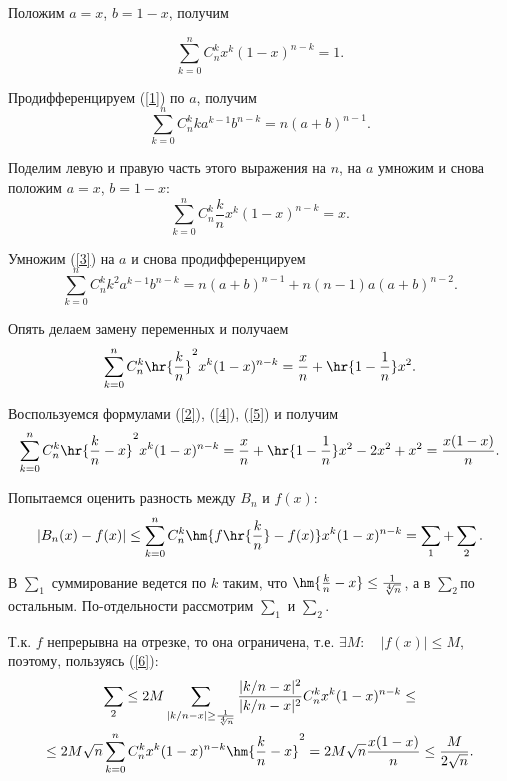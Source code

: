 \documentclass[a4paper]{article}
\begin{document}
Положим $a=x$, $b=1-x$, получим

\begin{equation}\label{2}
\sum_{k=0}^n C_n^k x^k (1-x)^{n-k}=1.
\end{equation}

Продифференцируем (\ref{1}) по $a$, получим
\begin{equation}\label{3}
\sum_{k=0}^n C_n^k ka^{k-1} b^{n-k}=n(a+b)^{n-1}.
\end{equation}

Поделим левую и правую часть этого выражения на $n$, на $a$ умножим и снова положим $a=x$, $b=1-x$:
\begin{equation}\label{4}
\sum_{k=0}^n C_n^k \frac{k}{n}x^k(1-x)^{n-k}=x.
\end{equation}

Умножим (\ref{3}) на $a$ и снова продифференцируем
\begin{equation*}
\sum_{k=0}^n C_n^k
k^2a^{k-1}b^{n-k}=n(a+b)^{n-1}+n(n-1)a(a+b)^{n-2}.
\end{equation*}

Опять делаем замену переменных и получаем
\begin{equation}\label{5}
\sum_{k=0}^n C_n^k
\hr{\frac{k}{n}}^2x^k(1-x)^{n-k}=\frac{x}{n}+\hr{1-\frac1{n}}x^2.
\end{equation}

Воспользуемся формулами (\ref{2}), (\ref{4}), (\ref{5}) и получим
\begin{equation}\label{6}
\sum_{k=0}^n C_n^k
\hr{\frac{k}{n}-x}^2x^k(1-x)^{n-k}=\frac{x}{n}+\hr{1-\frac1{n}}x^2-2x^2+x^2=\frac{x(1-x)}{n}.
\end{equation}

Попытаемся оценить разность между $B_n$ и $f(x)$:
\begin{equation*}
|B_n(x)-f(x)|\le\sum\limits_{k=0}^n
C_n^k\hm{f\hr{\frac{k}{n}}-f(x)}x^k(1-x)^{n-k}=\sum_1+\sum_2.
\end{equation*}

В $\sum_1$ суммирование ведется по $k$ таким, что
$\hm{\frac{k}{n}-x}\le\frac1{\sqrt[4]{n}}$, а в $\sum_2$\т по остальным. По-отдельности рассмотрим $\sum_1$ и $\sum_2$.

Т.к. $f$ непрерывна на отрезке, то она ограничена, т.е. $\exi
M:\quad|f(x)|\le M$, поэтому, пользуясь (\ref{6}):
\begin{multline}\label{8}
\sum_2\le 2M\sum_{|k/n-x|\ge \frac1{\sqrt[4]{n}}}
\frac{|k/n-x|^2}{|k/n-x|^2}C_n^k
x^k(1-x)^{n-k}\le\\
\le2M\sqrt{n}\sum\limits_{k=0}^n C_n^k
x^k(1-x)^{n-k}\hm{\frac{k}{n}-x}^2=2M\sqrt{n}\frac{x(1-x)}{n}\le\frac
{M}{2\sqrt{n}}.
\end{multline}
\end{document}
